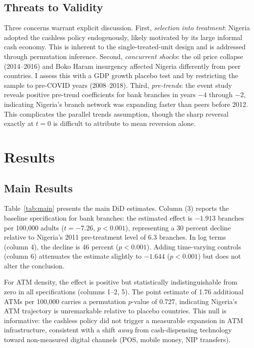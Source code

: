 \documentclass[12pt]{article}
\begin{document}
\subsection{Threats to Validity}

Three concerns warrant explicit discussion. First, \textit{selection into treatment}: Nigeria adopted the cashless policy endogenously, likely motivated by its large informal cash economy. This is inherent to the single-treated-unit design and is addressed through permutation inference. Second, \textit{concurrent shocks}: the oil price collapse (2014--2016) and Boko Haram insurgency affected Nigeria differently from peer countries. I assess this with a GDP growth placebo test and by restricting the sample to pre-COVID years (2008--2018). Third, \textit{pre-trends}: the event study reveals positive pre-trend coefficients for bank branches in years $-4$ through $-2$, indicating Nigeria's branch network was expanding faster than peers before 2012. This complicates the parallel trends assumption, though the sharp reversal exactly at $t = 0$ is difficult to attribute to mean reversion alone.

\section{Results}

\subsection{Main Results}



Table~\ref{tab:main} presents the main DiD estimates. Column (3) reports the baseline specification for bank branches: the estimated effect is $-1.913$ branches per 100,000 adults ($t = -7.26$, $p < 0.001$), representing a 30 percent decline relative to Nigeria's 2011 pre-treatment level of 6.3 branches. In log terms (column 4), the decline is 46 percent ($p < 0.001$). Adding time-varying controls (column 6) attenuates the estimate slightly to $-1.644$ ($p < 0.001$) but does not alter the conclusion.

For ATM density, the effect is positive but statistically indistinguishable from zero in all specifications (columns 1--2, 5). The point estimate of 1.76 additional ATMs per 100,000 carries a permutation $p$-value of 0.727, indicating Nigeria's ATM trajectory is unremarkable relative to placebo countries. This null is informative: the cashless policy did not trigger a measurable expansion in ATM infrastructure, consistent with a shift \textit{away} from cash-dispensing technology toward non-measured digital channels (POS, mobile money, NIP transfers).
\end{document}
